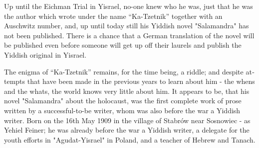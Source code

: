 \documentclass{article}
\begin{document}
\begin{pairs}
\begin{Leftside}
\begin{english}
 Up until the Eichman Trial in Yisrael, no-one knew who he was, just that he was the author which wrote under the name 
 ``Ka-Tzetnik''
together with an Auschwitz number, and, up until today still his Yiddish novel "Salamandra" has not been published.
There is a chance that a German translation of the novel will be published even before someone
will get up off their laurels and publish the Yiddish original in Yisrael.


 The enigma of ``Ka-Tzetnik'' remains, for the time being, a riddle; and despite attempts that have been made in 
 the previous years to learn about him - the whens and the whats,  
the world knows very little about him.
It appears to be, that his novel "Salamandra" about the holocaust, was the first complete work of prose written by a successful-to-be writer, whom was also
before the war a Yiddish writer.
Born on the 16th May 1909 in the village of Stabrów near Sosnowiec - as Yehiel Feiner; he was already before the war a Yiddish writer, a delegate 
for the youth efforts in "Agudat-Yisrael" in Poland, and a teacher of Hebrew and Tanach. 

\endnumbering
\end{english}
\end{Leftside}

\end{pairs}
\Columns
\end{document}

